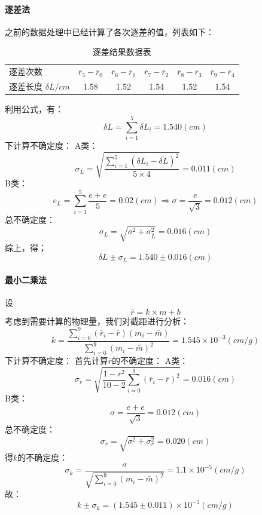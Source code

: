 \documentclass{ctexart}
\begin{document}
\paragraph{逐差法}之前的数据处理中已经计算了各次逐差的值，列表如下：
\begin{table}[htbp]
  \centering
  \caption{逐差结果数据表}
    \begin{tabular}{lccccc}
    逐差次数  & \multicolumn{1}{l}{$\bar{r}_5-\bar{r}_0$} & \multicolumn{1}{l}{$\bar{r}_6-\bar{r}_1$} & \multicolumn{1}{l}{$\bar{r}_7-\bar{r}_2$} & \multicolumn{1}{l}{$\bar{r}_8-\bar{r}_3$} & \multicolumn{1}{l}{$\bar{r}_9-\bar{r}_4$} \\
    逐差长度 $\delta L/cm$ & 1.58  & 1.52  & 1.54  & 1.52  & 1.54  \\
    \end{tabular}%
  \label{tab:addlabel}%
\end{table}%

利用公式，有：
$$\delta L=\sum_{i=1}^5{\delta L_i}=1.540(cm)$$
下计算不确定度：
A类：$$\sigma_{\bar{L}}=\sqrt{\frac{\sum\limits_{i=1}^5{(\delta L_i-\overline{\delta L})^2}}{5\times4}}=0.011(cm)$$
B类：$$e_L=\sum\limits_{i=1}^5{\frac{e+e}5}=0.02(cm)\Rightarrow \sigma=\frac{e}{\sqrt{3}}=0.012(cm)$$
总不确定度：$$\sigma_L=\sqrt{\sigma^2+\sigma_{\bar{L}}^2}=0.016(cm)$$
综上，得；$$\delta L\pm \sigma_L=1.540\pm 0.016(cm)$$
\paragraph{最小二乘法}
设$$\bar{r}=k\times m+b$$
考虑到需要计算的物理量，我们对截距进行分析：
$$k=\frac{\sum\limits_{i=0}^9{(\bar{r}_i-\bar{r})(m_i-\bar{m})}}{\sum\limits_{i=0}^9{(m_i-\bar{m})^2}}=1.545\times 10^{-3}(cm/g)$$
下计算不确定度：
首先计算$\bar{r}$的不确定度：
A类：$$\sigma_r =\sqrt{\frac{1-r^2}{10-2}\sum\limits_{i=0}^9{(\bar{r}_i-\bar{r})^2}}=0.016(cm)$$
B类：$$\sigma=\frac{e+e}{\sqrt{3}}=0.012(cm)$$
总不确定度：$$\sigma_{\bar{r}}=\sqrt{\sigma^2+\sigma_r^2}=0.020(cm)$$
得$k$的不确定度：
$$\sigma_k=\frac{\sigma}{\sqrt{\sum\limits_{i=0}^9{(m_i-\bar{m})^2}}}=1.1\times10^{-5}(cm/g)$$
故：
$$k\pm \sigma_k=(1.545\pm 0.011  )\times 10^{-3}(cm/g)$$
\end{document}
